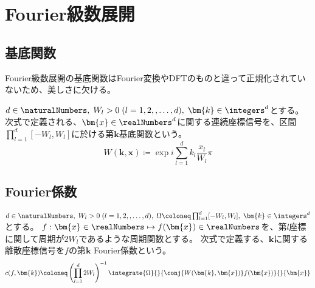 \chapter{Fourier級数展開}
    \section{基底関数}
        Fourier級数展開の基底関数はFourier変換やDFTのものと違って正規化されていないため、美しさに欠ける。
        \par
        $d\in\naturalNumbers,\;W_l>0\;(l=1,2,,\dots,d),\;\bm{k}\in\integers^d$とする。
        次式で定義される、$\bm{x}\in\realNumbers^d$に関する連続座標信号を、区間$\prod_{l=1}^d [-W_l,W_l]$に於ける第$\bm{k}$基底関数という。
        \[ W(\bm{k},\bm{x}) \coloneq \exp i\sum_{l=1}^d k_l\frac{x_l}{W_l}\pi \]

    \section{Fourier係数}
        $d\in\naturalNumbers,\;W_l>0\;(l=1,2,,\dots,d),\;\Omega\coloneq\prod_{l=1}^d [-W_l,W_l],\;\bm{k}\in\integers^d$とする。
        $f:\bm{x}\in\realNumbers \mapsto f(\bm{x})\in\realNumbers$を、第$l$座標に関して周期が$2W_l$であるような周期関数とする。
        次式で定義する、$\bm{k}$に関する離散座標信号を$f$の第$\bm{k}$ Fourier係数という。
        \[ c(f,\bm{k}) \coloneq \left(\prod_{l=1}^d 2W_l\right)^{-1}\integrate{\Omega}{}{\conj{W(\bm{k},\bm{x})}f(\bm{x})}{}{\bm{x}} \]